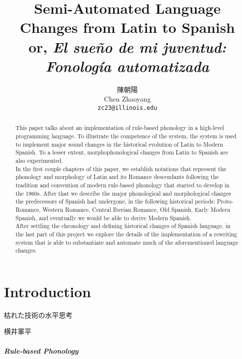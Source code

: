 \documentclass{report}
\title{Semi-Automated Language Changes from Latin to Spanish \\ or, \emph{El sueño de mi juventud: Fonología automatizada}}
\author{陳朝陽 \\ Chen Zhaoyang \\ \texttt{zc23@illinois.edu}}
\begin{document}
\maketitle

\pagebreak

\begin{abstract}
  
  This paper talks about an implementation of rule-based phonology in a high-level programming language. To illustrate the competence of the system, the system is used to implement major sound changes in the historical evolution of Latin to Modern Spanish. To a lesser extent, morphophonological changes from Latin to Spanish are also experimented. \\
  In the first couple chapters of this paper, we establish notations that represent the phonology and morphology of Latin and its Romance descendants following the tradition and convention of modern rule-based phonology that started to develop in the 1960s. After that we describe the major phonological and morphological changes the predecessors of Spanish had undergone, in the following historical periods: Proto-Romance, Western Romance, Central Iberian Romance, Old Spanish, Early Modern Spanish, and eventually we would be able to derive Modern Spanish. \\
  After settling the chronology and defining historical changes of Spanish language, in the last part of this project we explore the details of the implementation of a rewriting system that is able to substantiate and automate much of the aforementioned language changes.

\end{abstract}

\pagebreak

\tableofcontents

\pagebreak

\chapter*{Introduction}

\epigraph{枯れた技術の水平思考\footnotemark}{横井軍平}

\paragraph{Rule-based Phonology}
\end{document}
